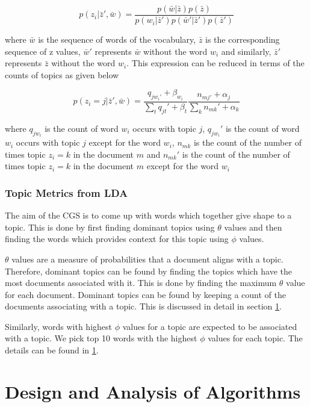 \documentclass[11pt,a4paper,oneside]{article}
\begin{document}
\begin{equation}
p(z_i|\bar{z}', \bar{w}) = \frac{p(\bar{w} | \bar{z}) p(\bar{z})}{p(w_i|\bar{z}')p(\bar{w}'|\bar{z}')p(\bar{z}')}
\end{equation}

where $\bar{w}$ is the sequence of words of the vocabulary, $\bar{z}$ is the corresponding sequence of z values, $\bar{w}'$ represents $\bar{w}$ without the word $w_i$ and similarly, $\bar{z}'$ represents $\bar{z}$ without the word $w_i$. This expression can be reduced in terms of the counts of topics as given below

\begin{equation}
\label{prob}
p(z_i = j | \bar{z}', \bar{w}) = \frac{q_{j w_{i}'} + \beta_{w_i}}{\sum_t{q_{jt}' + \beta_t}}\frac{n_{mj'} + \alpha_j}{\sum_k{n_{mk}' + \alpha_k}}
\end{equation}

where $q_{j w_i}$ is the count of word $w_i$ occurs with topic $j$, $q_{j w_i}'$ is the count of word $w_i$ occurs with topic $j$ except for the word $w_i$, $n_{mk}$ is the count of the number of times topic $z_i = k$ in the document $m$ and $n_{mk}'$ is the count of the number of times topic $z_i = k$ in the document $m$ except for the word $w_i$ 

\subsubsection{Topic Metrics from LDA}
The aim of the CGS is to come up with words which together give shape to a topic. This is done by first finding dominant topics using $\theta$ values and then finding the words which provides context for this topic using $\phi$ values. 

$\theta$ values are a measure of probabilities that a document aligns with a topic. Therefore, dominant topics can be found by finding the topics which have the most documents associated with it. This is done by finding the maximum $\theta$ value for each document. Dominant topics can be found by keeping a count of the documents associating with a topic. This is discussed in detail in section \ref{sec:Algorithms}.

Similarly, words with highest $\phi$ values for a topic are expected to be associated with a topic. We pick top 10 words with the highest $\phi$ values for each topic. The details can be found in \ref{sec:Algorithms}.

\section{Design and Analysis of Algorithms}
\label{sec:Algorithms}
\end{document}

